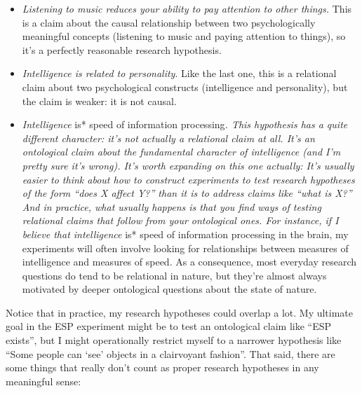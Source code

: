 \documentclass[
]{book}
\providecommand{\tightlist}{%
  \setlength{\itemsep}{0pt}\setlength{\parskip}{0pt}}
\begin{document}
\begin{itemize}
\tightlist
\item
  \emph{Listening to music reduces your ability to pay attention to other things.} This is a claim about the causal relationship between two psychologically meaningful concepts (listening to music and paying attention to things), so it's a perfectly reasonable research hypothesis.
\item
  \emph{Intelligence is related to personality}. Like the last one, this is a relational claim about two psychological constructs (intelligence and personality), but the claim is weaker: it is not causal.
\item
  \emph{Intelligence }is* speed of information processing\emph{. This hypothesis has a quite different character: it's not actually a relational claim at all. It's an ontological claim about the fundamental character of intelligence (and I'm pretty sure it's wrong). It's worth expanding on this one actually: It's usually easier to think about how to construct experiments to test research hypotheses of the form ``does X affect Y?'' than it is to address claims like ``what is X?'' And in practice, what usually happens is that you find ways of testing relational claims that follow from your ontological ones. For instance, if I believe that intelligence }is* speed of information processing in the brain, my experiments will often involve looking for relationships between measures of intelligence and measures of speed. As a consequence, most everyday research questions do tend to be relational in nature, but they're almost always motivated by deeper ontological questions about the state of nature.
\end{itemize}

Notice that in practice, my research hypotheses could overlap a lot. My ultimate goal in the ESP experiment might be to test an ontological claim like ``ESP exists'', but I might operationally restrict myself to a narrower hypothesis like ``Some people can `see' objects in a clairvoyant fashion''. That said, there are some things that really don't count as proper research hypotheses in any meaningful sense:
\end{document}
